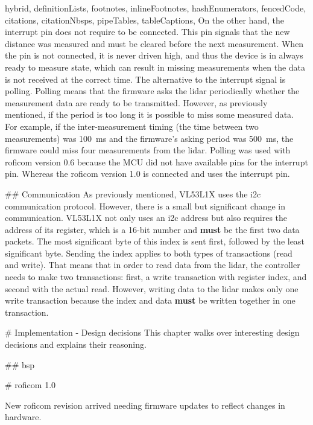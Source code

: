 \documentclass[
  digital,     %
  oneside,     %
  nosansbold,  %
  nocolorbold, %
  nolof,         %
  nolot,         %
]{fithesis4}
\begin{document}
\begin{markdown*}{%
  hybrid,
  definitionLists,
  footnotes,
  inlineFootnotes,
  hashEnumerators,
  fencedCode,
  citations,
  citationNbsps,
  pipeTables,
  tableCaptions,
}
On the other hand, the interrupt pin does not require to be connected. This pin signals that the new distance was measured and must be cleared before the next measurement. When the pin is not connected, it is never driven high, and thus the device is in always ready to measure state, which can result in missing measurements when the data is not received at the correct time. The alternative to the interrupt signal is polling. Polling means that the firmware asks the \acrshort{lidar} periodically whether the measurement data are ready to be transmitted. However, as previously mentioned, if the period is too long it is possible to miss some measured data. For example, if the inter-measurement timing (the time between two measurements) was \qty{100}{\milli\second} and the firmware's asking period was \qty{500}{\milli\second}, the firmware could miss four measurements from the \acrshort{lidar}. Polling was used with \acrshort{roficom} version 0.6 because the MCU did not have available pins for the interrupt pin. Whereas the \acrshort{roficom} version 1.0 is connected and uses the interrupt pin.

## Communication
As previously mentioned, VL53L1X uses the \acrshort{i2c} communication protocol. However, there is a small but significant change in communication. VL53L1X not only uses an \acrshort{i2c} address but also requires the address of its register, which is a 16-bit number and \textbf{must} be the first two data packets. The most significant byte of this index is sent first, followed by the least significant byte. Sending the index applies to both types of transactions (read and write). That means that in order to read data from the \acrshort{lidar}, the controller needs to make two transactions: first, a write transaction with register index, and second with the actual read. However, writing data to the \acrshort{lidar} makes only one write transaction because the index and data \textbf{must} be written together in one transaction.

# Implementation - Design decisions
This chapter walks over interesting design decisions and explains their reasoning.

## \texorpdfstring{ \acrlong{bsp} }{BSP} \label{BSP}

# \texorpdfstring{ \acrshort{roficom} }{RoFICoM} 1.0 \label{roficom 1.0}

New \acrshort{roficom} revision arrived needing firmware updates to reflect changes in hardware.


\end{markdown*}
\end{document}
